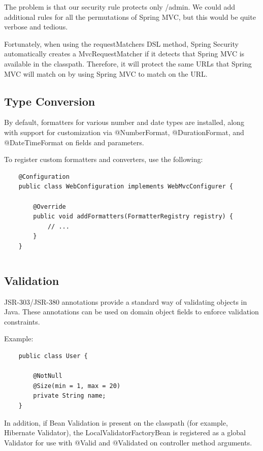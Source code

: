 \documentclass{scrartcl}
\begin{document}
The problem is that our security rule protects only /admin. We could add additional rules for all the permutations of Spring MVC, but this would be quite verbose and tedious.

Fortunately, when using the requestMatchers DSL method, Spring Security automatically creates a MvcRequestMatcher if it detects that Spring MVC is available in the classpath. Therefore, it will protect the same URLs that Spring MVC will match on by using Spring MVC to match on the URL.

\subsection{Type Conversion}

By default, formatters for various number and date types are installed, along with support for customization via @NumberFormat, @DurationFormat, and @DateTimeFormat on fields and parameters.

To register custom formatters and converters, use the following:

\begin{lstlisting}
    @Configuration
    public class WebConfiguration implements WebMvcConfigurer {

        @Override
        public void addFormatters(FormatterRegistry registry) {
            // ...
        }
    }
\end{lstlisting}

\begin{lstlisting}
\end{lstlisting}

\subsection{Validation}

JSR-303/JSR-380 annotations provide a standard way of validating objects in Java. These annotations can be used on domain object fields to enforce validation constraints.

Example:

\begin{lstlisting}
    public class User {

        @NotNull
        @Size(min = 1, max = 20)
        private String name;
    }
\end{lstlisting}

In addition, if Bean Validation is present on the classpath (for example, Hibernate Validator), the LocalValidatorFactoryBean is registered as a global Validator for use with @Valid and @Validated on controller method arguments.
\end{document}
